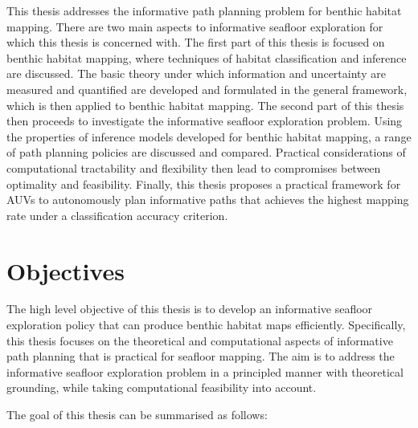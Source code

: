 		This thesis addresses the informative path planning problem for benthic habitat mapping. There are two main aspects to informative seafloor exploration for which this thesis is concerned with. The first part of this thesis is focused on benthic habitat mapping, where techniques of habitat classification and inference are discussed. The basic theory under which information and uncertainty are measured and quantified are developed and formulated in the general framework, which is then applied to benthic habitat mapping. The second part of this thesis then proceeds to investigate the informative seafloor exploration problem. Using the properties of inference models developed for benthic habitat mapping, a range of path planning policies are discussed and compared. Practical considerations of computational tractability and flexibility then lead to compromises between optimality and feasibility. Finally, this thesis proposes a practical framework for AUVs to autonomously plan informative paths that achieves the highest mapping rate under a classification accuracy criterion.
		
	\section{Objectives}
	\label{Introduction:Objective}
		The high level objective of this thesis is to develop an informative seafloor exploration policy that can produce benthic habitat maps efficiently. Specifically, this thesis focuses on the theoretical and computational aspects of informative path planning that is practical for seafloor mapping. The aim is to address the informative seafloor exploration problem in a principled manner with theoretical grounding, while taking computational feasibility into account. 
		
		The goal of this thesis can be summarised as follows:
		
